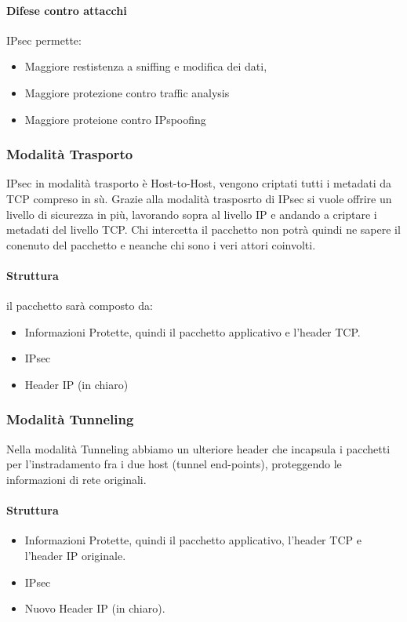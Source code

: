 \documentclass[12pt, a4paper, openany]{book}
\begin{document}
\paragraph{Difese contro attacchi}
IPsec permette:
\begin{itemize}
    \item Maggiore restistenza a sniffing e modifica dei dati,
    \item Maggiore protezione contro traffic analysis
    \item Maggiore proteione contro IPspoofing
\end{itemize}
\subsubsection{Modalità Trasporto}
IPsec in modalità trasporto è Host-to-Host, vengono criptati tutti i metadati da TCP compreso in sù.
Grazie alla modalità trasposrto di IPsec si vuole offrire un livello di sicurezza in più, lavorando sopra al livello IP e andando a criptare i metadati del livello TCP.
Chi intercetta il pacchetto non potrà quindi ne sapere il conenuto del pacchetto e neanche chi sono i veri attori coinvolti.
\paragraph*{Struttura} il pacchetto sarà composto da:
\begin{itemize}
    \item Informazioni Protette, quindi il pacchetto applicativo e l'header TCP.
    \item IPsec
    \item Header IP (in chiaro)
\end{itemize}

\subsubsection{Modalità Tunneling}
Nella modalità Tunneling abbiamo un ulteriore header che incapsula i pacchetti per l'instradamento fra i due host (tunnel end-points), proteggendo le informazioni di rete originali.

\paragraph*{Struttura}
\begin{itemize}
    \item Informazioni Protette, quindi il pacchetto applicativo, l'header TCP e l'header IP originale.
    \item IPsec
    \item Nuovo Header IP (in chiaro).
\end{itemize}
\end{document}
